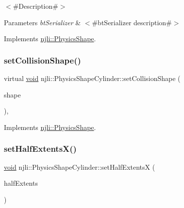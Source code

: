 $<$\#\+Description\#$>$


\begin{DoxyParams}{Parameters}
{\em bt\+Serializer} & $<$\#bt\+Serializer description\#$>$ \\
\hline
\end{DoxyParams}


Implements \mbox{\hyperlink{classnjli_1_1_physics_shape_a2ac8a109a5ad67ee79f40ce8f28337cf}{njli\+::\+Physics\+Shape}}.

\mbox{\label{classnjli_1_1_physics_shape_cylinder_aca6f41dfec9b3287717357cbfa57935a}} 
\subsubsection{\texorpdfstring{set\+Collision\+Shape()}{setCollisionShape()}}
{\footnotesize\ttfamily virtual \mbox{\hyperlink{_thread_8h_af1e856da2e658414cb2456cb6f7ebc66}{void}} njli\+::\+Physics\+Shape\+Cylinder\+::set\+Collision\+Shape (\begin{DoxyParamCaption}\item[{const bt\+Collision\+Shape \&}]{shape }\end{DoxyParamCaption})\hspace{0.3cm}{\ttfamily [protected]}, {\ttfamily [virtual]}}



Implements \mbox{\hyperlink{classnjli_1_1_physics_shape_a441e82a42f3b588a409c3b6c41288abd}{njli\+::\+Physics\+Shape}}.

\mbox{\label{classnjli_1_1_physics_shape_cylinder_a685026badc2ed6c9bd64ec4784fbfd15}} 
\subsubsection{\texorpdfstring{set\+Half\+Extents\+X()}{setHalfExtentsX()}}
{\footnotesize\ttfamily \mbox{\hyperlink{_thread_8h_af1e856da2e658414cb2456cb6f7ebc66}{void}} njli\+::\+Physics\+Shape\+Cylinder\+::set\+Half\+ExtentsX (\begin{DoxyParamCaption}\item[{const bt\+Vector3 \&}]{half\+Extents }\end{DoxyParamCaption})}

